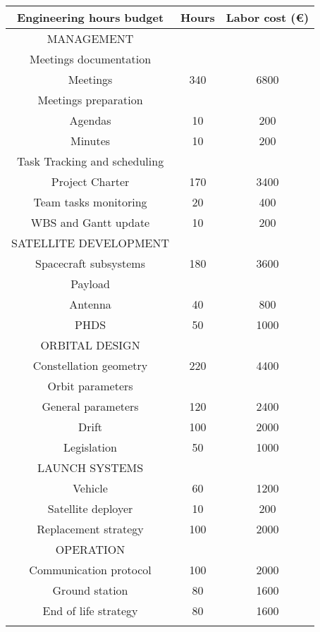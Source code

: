 \begin{longtable}{ccc}
\toprule
\rowcolor[gray]{0.75}
    \textbf{Engineering hours budget} & \textbf{Hours} & \textbf{Labor cost (\euro)} \\
    \midrule
    \endhead
\hline
\rowcolor[gray]{0.85}
	MANAGEMENT &  &  \\ \hline
	Meetings documentation &  &  \\ \hline
	Meetings & 340 & 6800 \\ \hline
	Meetings preparation &  &  \\ \hline
	Agendas & 10 & 200 \\ \hline
	Minutes & 10 & 200 \\ \hline
	Task Tracking and scheduling &  &  \\ \hline
	Project Charter & 170 & 3400 \\ \hline
	Team tasks monitoring & 20 & 400 \\ \hline
	WBS and Gantt update & 10 & 200 \\ \hline
	\rowcolor[gray]{0.85}
	SATELLITE DEVELOPMENT &  &  \\ \hline
	Spacecraft subsystems & 180 & 3600 \\ \hline
	Payload &  &  \\ \hline
	Antenna & 40 & 800 \\ \hline
	PHDS & 50 & 1000 \\ \hline
	\rowcolor[gray]{0.85}
	ORBITAL DESIGN &  &  \\ \hline
	Constellation geometry & 220 & 4400 \\ \hline
	Orbit parameters &  &  \\ \hline
	General parameters & 120 & 2400 \\ \hline
	Drift & 100 & 2000 \\ \hline
	Legislation & 50 & 1000 \\ \hline
	\rowcolor[gray]{0.85}
	LAUNCH SYSTEMS &  &  \\ \hline
	Vehicle & 60 & 1200 \\ \hline
	Satellite deployer & 10 & 200 \\ \hline
	Replacement strategy & 100 & 2000 \\ \hline
	\rowcolor[gray]{0.85}
	OPERATION &  &  \\ \hline
	Communication protocol & 100 & 2000 \\ \hline
	Ground station & 80 & 1600 \\ \hline
	End of life strategy & 80 & 1600 \\ \hline
	\rowcolor[gray]{0.85}

\end{longtable}

